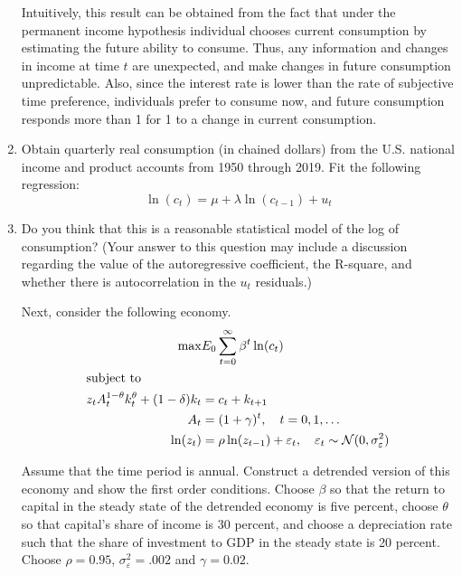 \documentclass[11pt]{article}
\begin{document}
\begin{enumerate}
Intuitively, this result can be obtained from the fact that under the permanent income hypothesis individual chooses current consumption by estimating the future ability to consume. Thus, any information and changes in income at time $t$ are unexpected, and make changes in future consumption unpredictable. Also, since the interest rate is lower than the rate of subjective time preference, individuals prefer to consume now, and future consumption responds more than 1 for 1 to a change in current consumption.

\newpage
\item  Obtain quarterly real consumption (in chained dollars) from the U.S.
national income and product accounts from 1950 through 2019. Fit the following
regression:
\[
\ln(c_t) = \mu + \lambda \ln(c_{t-1}) + u_t
\]

\newpage
\item  Do you think that this is a reasonable statistical model of the log of
consumption? (Your answer to this question may include a discussion regarding
the value of the autoregressive coefficient, the R-square, and whether there is
autocorrelation in the $u_t$ residuals.)

\newpage
Next, consider the following economy.
\begin{align*}
\max & E_0 \sum^\infty_{t = 0}\beta^t \ln (c_t)\\
\intertext{subject to}
z_t A_t^{1 - \theta} k_t^\theta + (1 - \delta)k_t &= c_t + k_{t + 1}\\
A_t &= (1 + \gamma)^t, \quad t = 0, 1, \ldots \\
\ln(z_t) &= \rho \ln (z_{t - 1}) + \varepsilon_t,\quad \varepsilon_t \sim \mathcal{N}(0, \sigma^2_\varepsilon)
\end{align*}

Assume that the time period is annual. Construct a detrended version of
this economy and show the first order conditions. Choose $\beta$ so that the return
to capital in the steady state of the detrended economy is five percent, choose
$\theta$ so that capital’s share of income is 30 percent, and choose a depreciation rate
such that the share of investment to GDP in the steady state is 20 percent.
Choose $\rho = 0.95$, $\sigma^2_\varepsilon
 = .002$ and $\gamma = 0.02$.


\end{enumerate}
\end{document}
